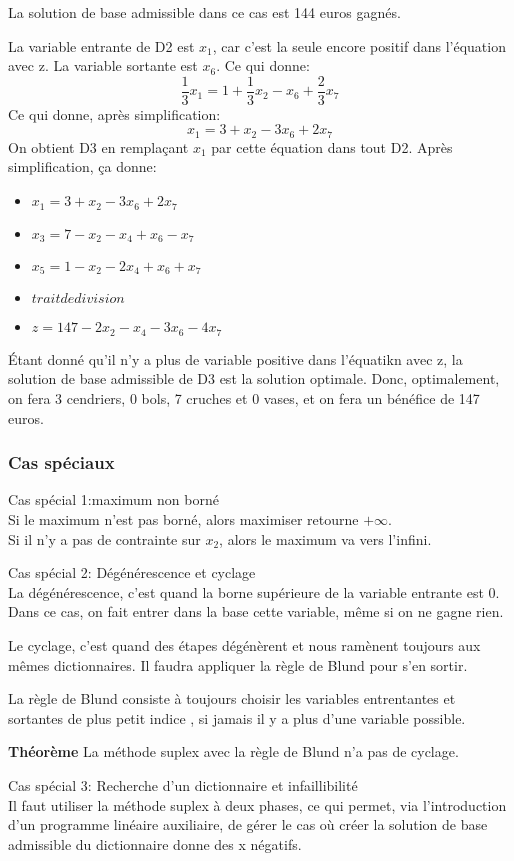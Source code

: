 La solution de base admissible dans ce cas est 144 euros
gagnés.

La variable entrante de D2 est $x_1$, car c'est la seule
encore positif dans l'équation avec z. La variable
sortante est $x_6$. Ce qui donne:
$$\frac{1}{3}x_1 = 1 + \frac{1}{3}x_2 - x_6 + \frac{2}{3}x_7$$
Ce qui donne, après simplification:
$$x_1 = 3 + x_2 - 3x_6 + 2x_7$$
On obtient D3 en remplaçant $x_1$ par cette équation
dans tout D2. Après simplification, ça donne:
\begin{itemize}
    \item $x_1 = 3 + x_2 - 3x_6 + 2x_7$
    \item $x_3 = 7 - x_2 - x_4 + x_6 - x_7$
    \item $x_5 = 1 - x_2 - 2x_4 + x_6 + x_7$
    \item $trait de division$
    \item $z = 147 -2x_2 - x_4 - 3x_6 - 4x_7$
\end{itemize}

Étant donné qu'il n'y a plus de variable positive dans
l'équatikn avec z, la solution de base admissible de D3
est la solution optimale. Donc, optimalement, on fera
3 cendriers, 0 bols, 7 cruches et 0 vases, et on fera
un bénéfice de 147 euros.

\subsubsection{Cas spéciaux}
Cas spécial 1:maximum non borné\\
Si le maximum n'est pas borné, alors maximiser retourne $+\infty$.\\
Si il n'y a pas de contrainte sur $x_2$, alors le
maximum va vers l'infini.

Cas spécial 2: Dégénérescence et cyclage\\
La dégénérescence, c'est quand la borne supérieure de la
variable entrante est 0. Dans ce cas, on fait entrer
dans la base cette variable, même si on ne gagne rien.

Le cyclage, c'est quand des étapes dégénèrent et nous
ramènent toujours aux mêmes dictionnaires. Il faudra
appliquer la règle de Blund pour s'en sortir.

La règle de Blund consiste à toujours choisir les
variables entrentantes et sortantes de plus petit indice
, si jamais il y a plus d'une variable possible.

\textbf{Théorème} La méthode suplex avec la règle de
Blund n'a pas de cyclage.

Cas spécial 3: Recherche d'un dictionnaire et
infaillibilité\\
Il faut utiliser la méthode suplex à deux phases, ce qui
permet, via l'introduction d'un programme linéaire
auxiliaire, de gérer le cas où créer la solution de base
admissible du dictionnaire donne des x négatifs.
